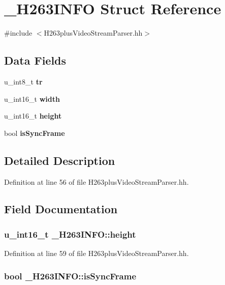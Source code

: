 \section{\+\_\+\+H263\+I\+N\+F\+O Struct Reference}
\label{struct__H263INFO}


{\ttfamily \#include $<$H263plus\+Video\+Stream\+Parser.\+hh$>$}

\subsection*{Data Fields}
\begin{DoxyCompactItemize}
\item 
u\+\_\+int8\+\_\+t {\bf tr}
\item 
u\+\_\+int16\+\_\+t {\bf width}
\item 
u\+\_\+int16\+\_\+t {\bf height}
\item 
bool {\bf is\+Sync\+Frame}
\end{DoxyCompactItemize}


\subsection{Detailed Description}


Definition at line 56 of file H263plus\+Video\+Stream\+Parser.\+hh.



\subsection{Field Documentation}
\subsubsection[{height}]{\setlength{\rightskip}{0pt plus 5cm}u\+\_\+int16\+\_\+t \+\_\+\+H263\+I\+N\+F\+O\+::height}\label{struct__H263INFO_ab0274981f993b3ec369153be1468583c}


Definition at line 59 of file H263plus\+Video\+Stream\+Parser.\+hh.

\subsubsection[{is\+Sync\+Frame}]{\setlength{\rightskip}{0pt plus 5cm}bool \+\_\+\+H263\+I\+N\+F\+O\+::is\+Sync\+Frame}\label{struct__H263INFO_ac5d1aee0e27e8f31e9584c47904baa80}


